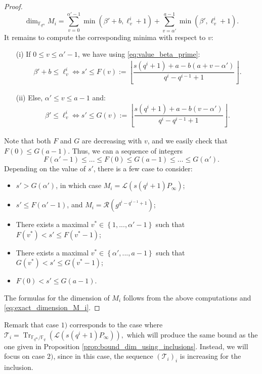 \documentclass[a4paper]{article}
\theoremstyle{definition}
\theoremstyle{remark}
\newcommand{\calL}{\mathcal{L}}
\newcommand{\calR}{\mathcal{R}}
\newcommand{\calT}{\mathcal{T}}
\newcommand{\fqm}{\mathbb{F}_{q^m}}
\newcommand{\fq}{\mathbb{F}_{q}}
\newcommand{\Tr}[1]{\operatorname{Tr}_{\mathbb{F}_{q^m}/\fq}\left(#1\right)}
\newcommand{\set}[1]{\left\{#1\right\}}
\begin{document}
\begin{proof}
\begin{equation} \label{eq:exact_dimension_M_i}
\dim_{\fqm} M_i = \sum\limits_{v=0}^{\alpha'-1} \min(\beta'+b,\ell_v^i+1) + \sum\limits_{v=\alpha'}^{a-1} \min(\beta',\ell_v^i+1).
\end{equation}
It remains to compute the corresponding minima with respect to $v$:
\begin{itemize}
    \item[(i)] If $0 \leq v \leq \alpha'-1$, we have using \eqref{eq:value_beta_prime}:
    \begin{align*}
        \beta'+b \leq \ell_v^i \iff s' \leq F(v) := \left\lfloor \dfrac{s(q^i+1)+a-b(a+v-\alpha')}{q^i-q^{i-1}+1}\right\rfloor.
    \end{align*}
    \item[(ii)] Else, $\alpha' \leq v \leq a-1$ and:
    \begin{align*}
        \beta' \leq \ell_v^i \iff s' \leq G(v) := \left\lfloor \dfrac{s(q^i+1)+a-b(v-\alpha')}{q^i-q^{i-1}+1}\right\rfloor .
    \end{align*}
\end{itemize}
Note that both $F$ and $G$ are decreasing with $v$, and we easily check that $F(0) \leq G(a-1)$. Thus, we can a sequence of integers
$$F(\alpha'-1) \leq \dots \leq F(0) \leq G(a-1) \leq \dots \leq G(\alpha').$$
Depending on the value of $s'$, there is a few case to consider:
\begin{itemize}
    \item $s' >G(\alpha')$, in which case $M_i = \calL(s(q^i+1)P_\infty)$;
    \item $s' \leq F(\alpha'-1)$, and $M_i = \calR(g^{q^i-q^{i-1}+1})$;
    \item There exists a maximal $v^* \in \set{1,...,\alpha'-1}$ such that $F(v^*) < s' \leq F(v^*-1)$;
    \item There exists a maximal $v^* \in \set{\alpha',...,a-1}$ such that $G(v^*) < s' \leq G(v^*-1)$;
    \item $F(0) < s' \leq G(a-1)$.
\end{itemize}
The formulas for the dimension of $M_i$ follows from the above computations and \eqref{eq:exact_dimension_M_i}.
\end{proof}

Remark that case $1)$ corresponds to the case where $\calT_i = \Tr{\calL(s(q^i+1)P_\infty)}, $ which will produce the same bound as the one given in Proposition \ref{prop:bound_dim_using_inclusions}.
Instead, we will focus on case $2)$, since in this case, the sequence $(\calT_i)_i$ is increasing for the inclusion. 
\end{document}
